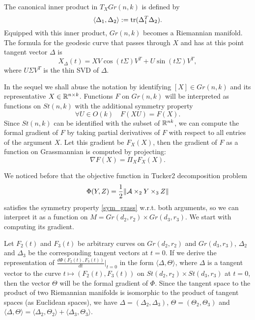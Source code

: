 The canonical inner product in $T_X Gr(n, k)$ is defined by
\begin{equation}
    \langle \Delta_1, \Delta_2 \rangle := \operatorname*{tr}( \Delta_1^T \Delta_2).
\end{equation}
Equipped with this inner product, $Gr(n, k)$ becomes a Riemannian
manifold. The formula
for the geodesic curve that passes through $X$ and has at this point tangent 
vector $\Delta$ is 
\begin{equation}
    X_{\Delta}(t) = XV \cos (t \Sigma) V^T + U \sin(t \Sigma) V^T,
\end{equation}
where $U \Sigma V^T$ is the thin SVD of $\Delta$.


In the sequel we shall abuse the notation by identifying $[X] \in Gr(n, k)$
and its representative $X \in \mathbb{R}^{n \times k}$. Functions $F$
on $Gr(n, k)$ will be interpreted as functions on $St(n, k)$ with the additional
symmetry property
\begin{equation}
    \label{sym_grass}
    \forall U \in O(k) \quad F(XU) = F(X).
\end{equation}
Since $St(n,k)$ can be identified with the subset of $\mathbb{R}^{nk}$, we can compute
the formal gradient of $F$ by taking partial derivatives of $F$
with respect to all entries of the argument $X$. Let this gradient
be $F_X(X)$, then the gradient of $F$ as a function on Grassmannian
is computed by projecting:
\begin{equation}
\nabla F (X) = \Pi_{X} F_X(X).
\end{equation}

We noticed before that the objective function in Tucker2 decomposition 
problem
\begin{equation}
\Phi(Y,Z) = \frac{1}{2} \| \mathcal{A} \times _{2} Y \times _{3} Z \| 
\end{equation}
satisfies the symmetry property \eqref{sym_grass} w.r.t. both arguments,
so we can interpret it as a function on $M = Gr(d_2, r_2) \times Gr(d_3, r_3)$.
We start with computing its gradient. 


Let ${F_2}(t)$ and ${F_3}(t)$ be arbitrary curves on $Gr(d_2, r_2)$
and $Gr(d_3, r_3)$, $\Delta_2$ and $\Delta_3$ be the corresponding tangent
vectors at $t = 0$.
If we derive the representation of $\frac{d \Phi(F_2(t), F_3(t))}{dt} \rvert_{t = 0}$ in the form
$\langle \Delta, \Theta \rangle$, where $\Delta$ is a tangent vector
to the curve $t \mapsto (F_2(t), F_3(t))$ on $St(d_2, r_2) \times St(d_3, r_3)$ 
at $t = 0$, then the vector $\Theta$ will be the formal gradient of $\Phi$.
Since the tangent space to the product of two Riemannian manifolds is
isomorphic to the product of tangent spaces (as Euclidean spaces), we
have $\Delta = (\Delta_2, \Delta_3)$, $\Theta = (\Theta_2, \Theta_3)$
and $\langle \Delta, \Theta \rangle = \langle \Delta_2, \Theta_2 \rangle + 
\langle \Delta_3, \Theta_3 \rangle $.


